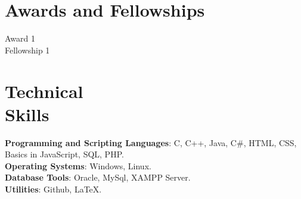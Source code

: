\documentclass[margin,line]{res}
\begin{document}
\begin{resume}
\section{\sc Awards and Fellowships}
Award 1\\
Fellowship 1\\
\fi

\iffalse
\section{\sc Personal Achievements}
---------------------\\
---------------------
\fi
\section{\sc Technical\\ Skills}
{\bf Programming and Scripting Languages}:  C, C++, Java, C\#, HTML, CSS, Basics in JavaScript, SQL, PHP.\\
{\bf Operating Systems}: Windows, Linux.\\
\iffalse
{\bf Tools}: Intel VTunes, GDB, Valgrind, Latex, Subversion, Crystal Reports, Informatica, Business Objects, IBM WebSphere Studio, MicroStrategy, Rational Rose Suite, Macromedia Dreamweaver, Adobe Photoshop \\
\fi
{\bf Database Tools}: Oracle, MySql, XAMPP Server.\\ 
{\bf Utilities}: Github, LaTeX. 
\vspace{0.3cm}

\iffalse

\end{resume}
\end{document}
